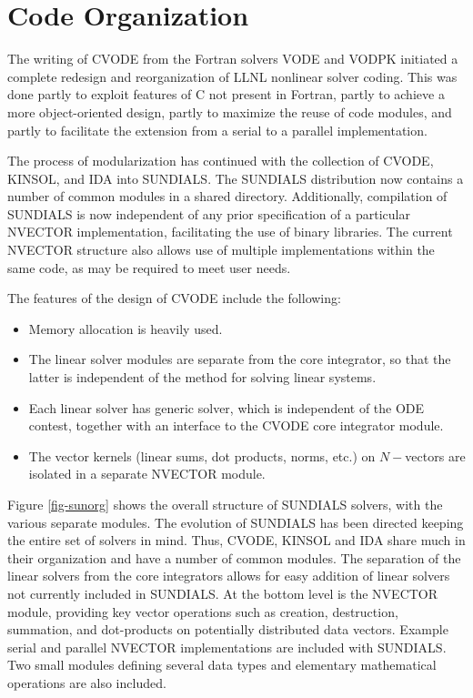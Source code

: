 \section{Code Organization}
\label{s:organization}

The writing of CVODE from the Fortran solvers VODE and VODPK initiated a
complete redesign and reorganization of LLNL nonlinear solver coding.  This
was done partly to exploit features of C not present in Fortran, partly to
achieve a more object-oriented design, partly to maximize the reuse of code
modules, and partly to facilitate the extension from a serial to a parallel
implementation.

The process of modularization has continued with the collection of CVODE,
KINSOL, and IDA into SUNDIALS. The SUNDIALS distribution now contains a
number of common modules in a shared directory. Additionally, compilation of
SUNDIALS is now independent of any prior specification of a particular
NVECTOR implementation, facilitating the use of binary libraries. The
current NVECTOR structure also allows use of multiple implementations within
the same code, as may be required to meet user needs.

The features of the design of CVODE include the following:
\begin{itemize}
\item Memory allocation is heavily used.
\item The linear solver modules are separate from the core integrator,
so that the latter is independent of the method for solving linear
systems.
\item Each linear solver has generic solver, which is independent of
the ODE contest, together with an interface to the CVODE core
integrator module.
\item The vector kernels (linear sums, dot products, norms, etc.) on
$N-$vectors are isolated in a separate NVECTOR module.
\end{itemize}

Figure \ref{fig-sunorg} shows the overall structure of SUNDIALS solvers,
with the various separate modules. The evolution of SUNDIALS has been
directed keeping the entire set of solvers in mind. Thus, CVODE, KINSOL and
IDA share much in their organization and have a number of common modules.
The separation of the linear solvers from the core integrators allows for
easy addition of linear solvers not currently included in SUNDIALS. At the
bottom level is the NVECTOR module, providing key vector operations such as
creation, destruction, summation, and dot-products on potentially
distributed data vectors. Example serial and parallel NVECTOR
implementations are included with SUNDIALS. Two small modules defining
several data types and elementary mathematical operations are also included.

